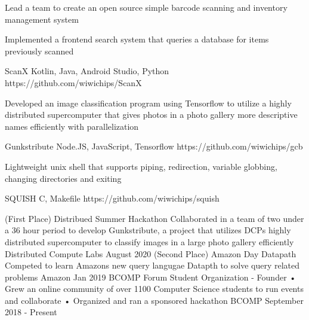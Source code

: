 \documentclass[]{awesome-cv}
\begin{document}
\vspace{-7mm}
\begin{cventries}
	\cventry
	{\begin{cvitems}
    \item{Lead a team to create an open source simple barcode scanning and inventory management system}
    \item{Implemented a frontend search system that queries a database for items previously scanned}
  \end{cvitems}}
	{ScanX}
	{Kotlin, Java, Android Studio, Python}
	{https://github.com/wiwichips/ScanX}
	{}
	
	\vspace{-5mm}
	\cventry
  {\begin{cvitems}
  	\item{Developed an image classification program using Tensorflow to utilize a highly distributed supercomputer that gives photos in a photo gallery more descriptive names efficiently with parallelization}
  \end{cvitems}}
	{Gunkstribute}
	{Node.JS, JavaScript, Tensorflow}
	{https://github.com/wiwichips/gcb}
	{}
	
	\vspace{-5mm}
	\cventry
  {\begin{cvitems}
  	\item{Lightweight unix shell that supports piping, redirection, variable globbing, changing directories and exiting}
  \end{cvitems}}
	{SQUISH}
	{C, Makefile}
	{https://github.com/wiwichips/squish}
	{}
	
	\vspace{-5mm}
\end{cventries}
\begin{cvhonors}
	\cvhonor
	{(First Place) Distribued Summer Hackathon}
	{Collaborated in a team of two under a 36 hour period to develop Gunkstribute, a project that utilizes DCP\textquotesingle{}s highly distributed supercomputer to classify images in a large photo gallery efficiently}
	{Distributed Compute Labs}
	{August 2020}
	\cvhonor
	{(Second Place) Amazon Day Datapath}
	{Competed to learn Amazon\textquotesingle{}s new query langugae Datapth to solve query related problems}
	{Amazon}
	{Jan 2019}
	\cvhonor
	{BCOMP Forum Student Organization - Founder}
	{• Grew an online community of over 1100 Computer Science students to run events and collaborate • Organized and ran a sponsored hackathon}
	{BCOMP}
	{September 2018 - Present}
\end{cvhonors}
\ 
\end{document}
